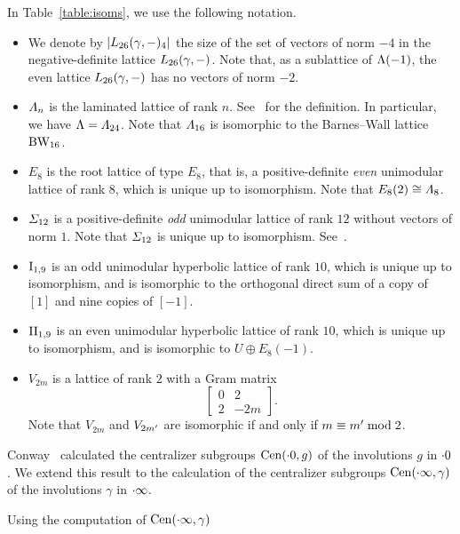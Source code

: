 \documentclass{amsart} %
\begin{document}
%
In  Table~\ref{table:isoms},  we use the following notation.
\begin{itemize}
\item
We denote by $|L_{26}(\gamma, -)_4|$
the size of the set of vectors of norm $-4$ in the negative-definite lattice $L_{26}(\gamma, -)$.
Note that, as a sublattice of $\Lambda(-1)$,  
the even lattice $L_{26}(\gamma, -)$ has no vectors of  norm $-2$.
\item 
$\varLambda_{n} $ is 
the laminated lattice of rank $n$. 
See~\cite[Chapter 6]{theCSbook} for the definition.
In particular, we have $\Lambda=\varLambda_{24}$.
Note that $\varLambda_{16}$  is isomorphic to the Barnes--Wall lattice $\mathrm{BW}_{16}$.
\item $E_8$ is the root lattice of type $E_8$, that is,
a positive-definite \emph{even}  unimodular  lattice of rank $8$,
which is unique up to isomorphism.
Note that  $E_8(2)\cong \varLambda_{8}$.
\item $\varSigma_{12}$ is 
a positive-definite \emph{odd}  unimodular  lattice of rank $12$
without  vectors of norm $1$.
Note that $\varSigma_{12}$ is unique up to isomorphism.
See~\cite[Table 16.7]{theCSbook}.
\item $\mathrm{I}_{1,9}$ is  an odd unimodular  hyperbolic lattice of rank $10$, 
which is  unique up to isomorphism,
and is  isomorphic to  the orthogonal direct sum of
 a copy of $[1]$ and nine copies of   $[-1]$.
 \item $\mathrm{II}_{1,9}$ is  an even unimodular hyperbolic lattice of rank $10$,
 which is  unique up to isomorphism,
 and  is isomorphic to $U\oplus E_8(-1)$.
\item $V_{2m}$ is a lattice of rank $2$
with a Gram matrix 
%
\begin{equation}\label{eq:GramVm}
\left[\begin{array}{cc} 0&2 \\ 2 & -2m \end{array}\right].
\end{equation}
%
Note that $V_{2m}$ and $V_{2m^{\prime}}$ are isomorphic 
if and only if $m\equiv m^{\prime} \bmod 2$.
\end{itemize}
%
\par
\medskip
Conway~\cite[Chapter 10]{theCSbook} calculated the centralizer subgroups  $\mathrm{Cen}(\cdot 0, g)$
of the involutions $g$ in $\cdot 0$.
We extend this result  to the calculation of  the centralizer subgroups  $\mathrm{Cen}(\cdot \infty, \gamma)$
of the involutions $\gamma$ in $\cdot \infty$.
\par
Using the computation of $\mathrm{Cen}(\cdot \infty, \gamma)$
\end{document}

